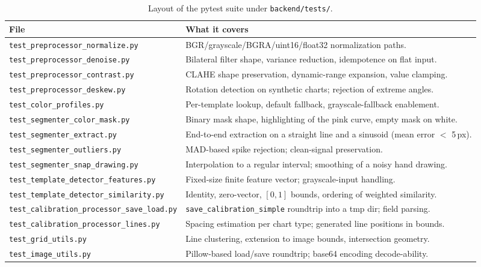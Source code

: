 \documentclass[a4paper,12pt]{report}
\begin{document}
\begin{table}[h!]
\caption[Test suite layout]{Layout of the pytest suite under \texttt{backend/tests/}.}
\begin{center}
\footnotesize
\renewcommand{\arraystretch}{1.0}
\begin{tabular}{|l|p{8.5cm}|} \hline
\textbf{File} & \textbf{What it covers} \\\hline
\texttt{test\_preprocessor\_normalize.py} & BGR/grayscale/BGRA/uint16/float32 normalization paths. \\\hline
\texttt{test\_preprocessor\_denoise.py} & Bilateral filter shape, variance reduction, idempotence on flat input. \\\hline
\texttt{test\_preprocessor\_contrast.py} & CLAHE shape preservation, dynamic-range expansion, value clamping. \\\hline
\texttt{test\_preprocessor\_deskew.py} & Rotation detection on synthetic charts; rejection of extreme angles. \\\hline
\texttt{test\_color\_profiles.py} & Per-template lookup, default fallback, grayscale-fallback enablement. \\\hline
\texttt{test\_segmenter\_color\_mask.py} & Binary mask shape, highlighting of the pink curve, empty mask on white. \\\hline
\texttt{test\_segmenter\_extract.py} & End-to-end extraction on a straight line and a sinusoid (mean error $<$ 5\,px). \\\hline
\texttt{test\_segmenter\_outliers.py} & MAD-based spike rejection; clean-signal preservation. \\\hline
\texttt{test\_segmenter\_snap\_drawing.py} & Interpolation to a regular interval; smoothing of a noisy hand drawing. \\\hline
\texttt{test\_template\_detector\_features.py} & Fixed-size finite feature vector; grayscale-input handling. \\\hline
\texttt{test\_template\_detector\_similarity.py} & Identity, zero-vector, $[0,1]$ bounds, ordering of weighted similarity. \\\hline
\texttt{test\_calibration\_processor\_save\_load.py} & \texttt{save\_calibration\_simple} roundtrip into a tmp dir; field parsing. \\\hline
\texttt{test\_calibration\_processor\_lines.py} & Spacing estimation per chart type; generated line positions in bounds. \\\hline
\texttt{test\_grid\_utils.py} & Line clustering, extension to image bounds, intersection geometry. \\\hline
\texttt{test\_image\_utils.py} & Pillow-based load/save roundtrip; base64 encoding decode-ability. \\\hline
\end{tabular}
\label{table:tests}
\end{center}
\end{table}
\end{document}
